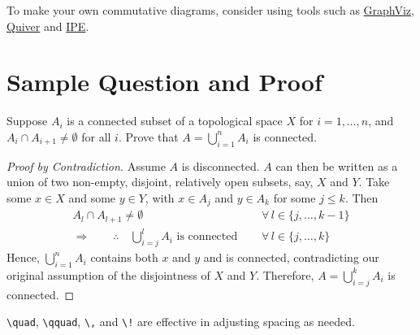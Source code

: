 To make your own commutative diagrams, consider using tools such as \href{graphviz.org}{GraphViz}, \href{q.uiver.app}{Quiver} and \href{ipe.otfried.org}{IPE}.

\newpage %


\section{Sample Question and Proof}

Suppose $A_i$ is a connected subset of a topological space $X$ for $i=1,\ldots,n$, and $A_i \cap A_{i+1} \neq \emptyset$ for all $i$. 
Prove that $A = \bigcup_{i=1}^n A_i$ is connected.

\begin{proof}[Proof by Contradiction]
Assume $A$ is disconnected. $A$ can then be written as a union of two non-empty, disjoint, relatively open subsets, say, $X$ and $Y$. Take some $x \in X$ and some $y \in Y$, with $x \in A_j$ and $y \in A_k$ for some $j \le k$. Then
\begin{align}\label{sampleeq}
A_l \cap A_{l+1} \neq \emptyset \qquad & \forall \, l \in \{j,\ldots,k-1\} \nonumber\\
\Rightarrow \qquad \therefore \quad \bigcup_{i=j}^l A_i \text{ is connected } \quad & \forall \, l \in \{j,\ldots,k\}
\end{align}
Hence, $\bigcup_{i=1}^n A_i$ contains both $x$ and $y$ and is connected, contradicting our original assumption of the disjointness of $X$ and $Y$. Therefore, $A=\bigcup_{i=j}^k A_i$ is connected.
\end{proof}

\begin{remark}
\verb+\quad+, \verb+\qquad+, \verb+\,+ and \verb+\!+ are effective in adjusting spacing as needed.
\end{remark}
